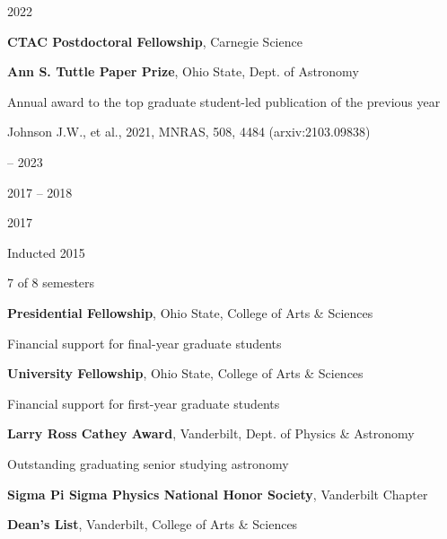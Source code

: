 \documentclass[cv.tex]{subfiles}
\begin{document}

\vspace{-5mm}
\noindent
\parbox{0.18\textwidth}{%
	 \par
	2022 \par
	\null \par
	\null \par
}
\hspace{1mm}
\parbox{0.8\textwidth}{%
	\vspace{1mm}
	\textbf{CTAC Postdoctoral Fellowship}, Carnegie Science \par
	\textbf{Ann S. Tuttle Paper Prize}, Ohio State, Dept. of Astronomy \par
	Annual award to the top graduate student-led publication of the previous
	year \par
	Johnson J.W., et al., 2021, MNRAS, 508, 4484 (arxiv:2103.09838) \par
}

\noindent
\parbox{0.18\textwidth}{%
	 -- 2023 \par
	\null \par
	2017 -- 2018 \par
	\null \par
	2017 \par
	\null \par
	Inducted 2015 \par
	7 of 8 semesters
}
\hspace{1mm}
\parbox{0.8\textwidth}{%
	\vspace{1mm}
	\textbf{Presidential Fellowship}, Ohio State, College of Arts \& Sciences
	\par
	Financial support for final-year graduate students \par
	\textbf{University Fellowship}, Ohio State, College of Arts \& Sciences \par
	Financial support for first-year graduate students \par
	\textbf{Larry Ross Cathey Award}, Vanderbilt, Dept. of Physics \& Astronomy
	\par
	Outstanding graduating senior studying astronomy \par
	\textbf{Sigma Pi Sigma Physics National Honor Society}, Vanderbilt Chapter
	\par
	\textbf{Dean's List}, Vanderbilt, College of Arts \& Sciences
}
\end{document}
